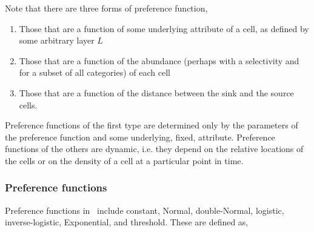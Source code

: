 Note that there are three forms of preference function,
\begin{enumerate}
\item Those that are a function of some underlying attribute of a cell, as defined by some arbitrary layer $L$
\item Those that are a function of the abundance (perhaps with a selectivity and for a subset of all categories) of each cell
\item Those that are a function of the distance between the sink and the source cells. 
\end{enumerate} 

Preference functions of the first type are determined only by the parameters of the preference function and some underlying, fixed, attribute. Preference functions of the others are dynamic, i.e. they depend on the relative locations of the cells or on the density of a cell at a particular point in time.

\subsubsection*{Preference functions}

Preference functions in \SPM\ include constant, Normal, double-Normal, logistic, inverse-logistic, Exponential, and threshold. These are defined as,

